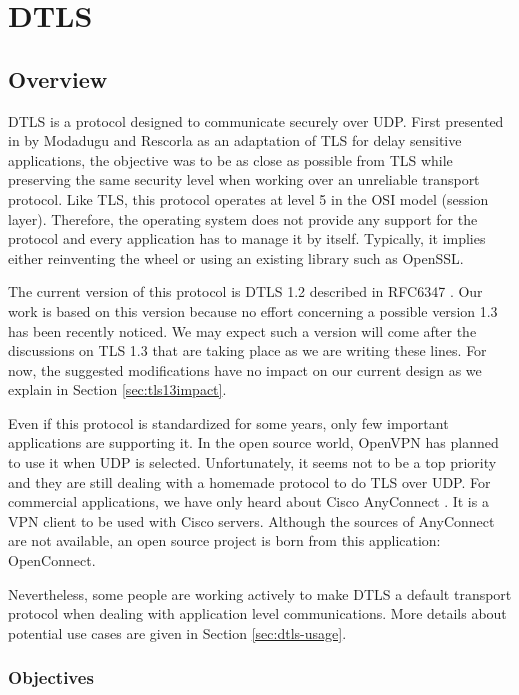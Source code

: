 \chapter{DTLS}\label{chap:dtls}


\section{Overview}

DTLS is a protocol designed to communicate securely over UDP. First presented in \cite{modadugu2004design} by Modadugu and Rescorla as an adaptation of TLS for delay sensitive applications, the objective was to be as close as possible from TLS while preserving the same security level when working over an unreliable transport protocol. Like TLS, this protocol operates at level 5 in the OSI model (session layer). Therefore, the operating system does not provide any support for the protocol and every application has to manage it by itself. Typically, it implies either reinventing the wheel or using an existing library such as OpenSSL\cite{openssl}.

The current version of this protocol is DTLS 1.2 described in RFC6347 \cite{rfc6347}. Our work is based on this version because no effort concerning a possible version 1.3 has been recently noticed. We may expect such a version will come after the discussions on TLS 1.3 that are taking place as we are writing these lines. For now, the suggested modifications have no impact on our current design as we explain in Section \ref{sec:tls13impact}.

Even if this protocol is standardized for some years, only few important applications are supporting it. In the open source world, OpenVPN has planned to use it when UDP is selected. Unfortunately, it seems not to be a top priority and they are still dealing with a homemade protocol to do TLS over UDP. For commercial applications, we have only heard about Cisco AnyConnect \cite{anyconnect}. It is a VPN client to be used with Cisco servers. Although the sources of AnyConnect are not available, an open source project is born from this application: OpenConnect\cite{openconnect}.

Nevertheless, some people are working actively to make DTLS a default transport protocol when dealing with application level communications. More details about potential use cases are given in Section \ref{sec:dtls-usage}.

\subsection{Objectives}

